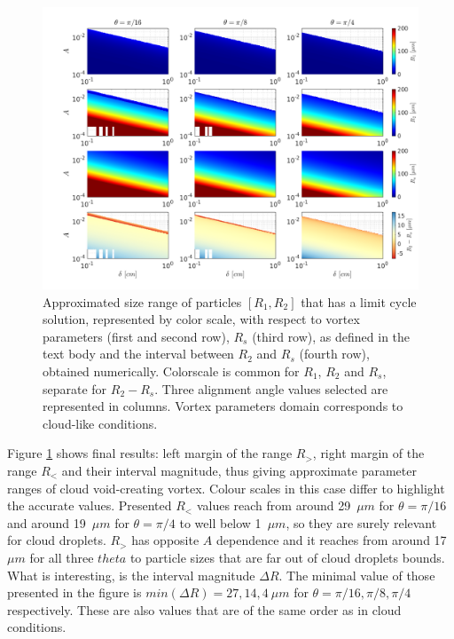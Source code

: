 \documentclass[../main.tex]{subfiles}
\begin{document}
\begin{figure}[h]
\centering
\noindent\includegraphics[width=35pc]{gfx/R1R2Rs.png}
\caption{Approximated size range of particles $[R_1,R_2]$ that has a limit cycle solution, represented by color scale, with respect to vortex parameters (first and second row), $R_s$ (third row), as defined in the text body and the interval between $R_2$ and $R_s$ (fourth row), obtained numerically. Colorscale is common for $R_1$, $R_2$ and $R_s$, separate for $R_2-R_s$. Three alignment angle values selected are represented in columns. Vortex parameters domain corresponds to cloud-like conditions.}
\label{fig:ch4_5}
\end{figure}

Figure \ref{fig:ch4_5} shows final results: left margin of the range $R_>$, right margin of the range $R_<$ and their interval magnitude, thus giving approximate parameter ranges of cloud void-creating vortex. Colour scales in this case differ to highlight the accurate values. Presented $R_<$ values reach from around 29~$\mu m$ for $\theta=\pi/16$ and around 19~$\mu m$ for $\theta=\pi/4$ to well below 1~$\mu m$, so they are surely relevant for cloud droplets. $R_>$ has opposite $A$ dependence and it reaches from around 17~$\mu m$ for all three $theta$ to particle sizes that are far out of cloud droplets bounds. What is interesting, is the interval magnitude $\Delta R$. The minimal value of those presented in the figure is $min(\Delta R)=27, 14, 4 \ \mu m$ for $\theta=\pi/16, \pi/8, \pi/4$ respectively. These are also values that are of the same order as in cloud conditions.
\end{document}
